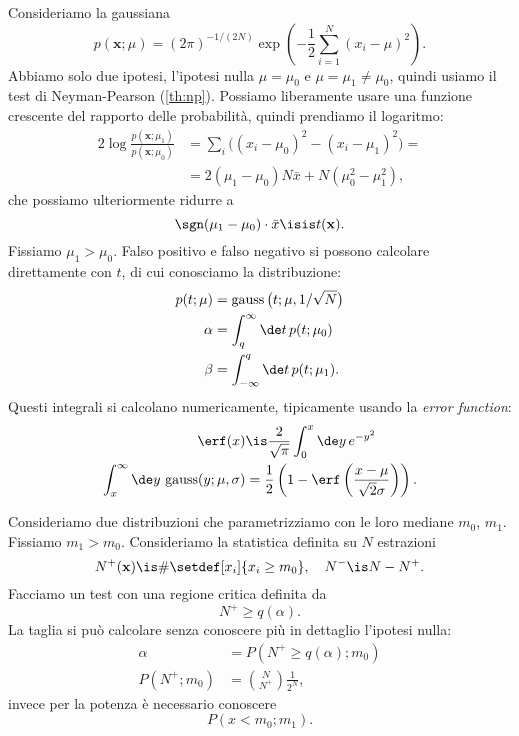 \begin{solution*}
	Consideriamo la gaussiana
	\begin{equation*}
		p(\mathbf x;\mu)
		= (2\pi)^{-1/(2N)}
		\exp \left( -\frac12 \sum_{i=1}^N (x_i-\mu)^2 \right).
	\end{equation*}
	Abbiamo solo due ipotesi,
	l'ipotesi nulla $\mu=\mu_0$ e $\mu=\mu_1\neq\mu_0$,
	quindi usiamo il test di Neyman-Pearson (\autoref{th:np}).
	Possiamo liberamente usare una funzione crescente del rapporto delle probabilità,
	quindi prendiamo il logaritmo:
	\begin{align*}
		2\log \frac {p(\mathbf x;\mu_1)} {p(\mathbf x;\mu_0)}
		&= \sum_i \big((x_i-\mu_0)^2 - (x_i-\mu_1)^2\big) = \\
		&= 2(\mu_1-\mu_0)N\bar x + N(\mu_0^2-\mu_1^2),
	\end{align*}
	che possiamo ulteriormente ridurre a
	\begin{equation*}
		\sgn(\mu_1-\mu_0)\cdot \bar x
		\isis t(\mathbf x).
	\end{equation*}
	Fissiamo $\mu_1 > \mu_0$.
	Falso positivo e falso negativo si possono calcolare direttamente con $t$,
	di cui conosciamo la distribuzione:
	\begin{align*}
		p(t;\mu)
		&= \operatorname{gauss}\big(t;\mu,1/\sqrt N\big) \\
		\alpha
		&= \int_q^\infty \de t\, p(t;\mu_0) \\
		\beta
		&= \int_{-\infty}^q \de t\, p(t;\mu_1).
	\end{align*}
	Questi integrali si calcolano numericamente,
	tipicamente usando la \emph{error function}:
	\begin{align*}
		\erf(x)
		&\is \frac2{\sqrt\pi} \int_0^x \de y\,e^{-y^2} \\
		\int_x^\infty \de y\, \operatorname{gauss}(y;\mu,\sigma)
		&= \frac12 \left( 1 - \erf\left(\frac{x-\mu}{\sqrt2\sigma}\right) \right).
	\end{align*}
\end{solution*}

\begin{example}
	Consideriamo due distribuzioni che parametrizziamo con le loro mediane $m_0$, $m_1$.
	Fissiamo $m_1>m_0$.
	Consideriamo la statistica definita su $N$ estrazioni
	\begin{equation*}
		N^+(\mathbf x)
		\is \#\setdef[x_i]{x_i\ge m_0},
		\quad N^- \is N - N^+.
	\end{equation*}
	Facciamo un test con una regione critica definita da
	\begin{equation*}
		N^+ \ge q(\alpha).
	\end{equation*}
	La taglia si può calcolare senza conoscere più in dettaglio l'ipotesi nulla:
	\begin{align*}
		\alpha
		&= P(N^+\ge q(\alpha);m_0) \\
		P(N^+;m_0)
		&= \binom N{N^+} \frac1{2^N},
	\end{align*}
	invece per la potenza è necessario conoscere
	\begin{equation*}
		P(x<m_0;m_1).
	\end{equation*}
\end{example}

